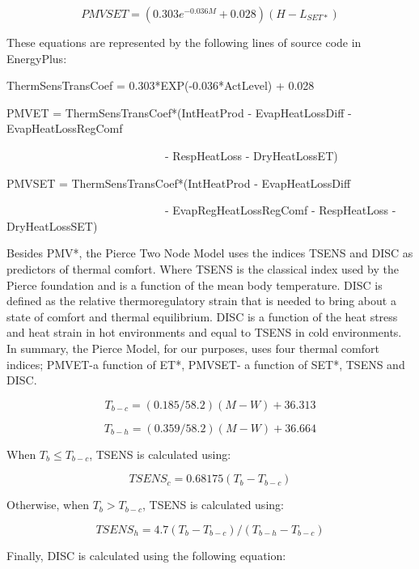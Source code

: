 \begin{equation}
PMVSET = (0.303{e^{ - 0.036M}} + 0.028)(H - {L_{SET*}})
\end{equation}

These equations are represented by the following lines of source code in EnergyPlus:

ThermSensTransCoef = 0.303*EXP(-0.036*ActLevel) + 0.028

PMVET = ThermSensTransCoef*(IntHeatProd - EvapHeatLossDiff - EvapHeatLossRegComf

~~~~~~~~~~~~~~~~~~~~~~~~~~~~- RespHeatLoss - DryHeatLossET)

PMVSET = ThermSensTransCoef*(IntHeatProd - EvapHeatLossDiff

~~~~~~~~~~~~~~~~~~~~~~~~~~~~- EvapRegHeatLossRegComf - RespHeatLoss - DryHeatLossSET)

Besides PMV*, the Pierce Two Node Model uses the indices TSENS and DISC as predictors of thermal comfort. Where TSENS is the classical index used by the Pierce foundation and is a function of the mean body temperature. DISC is defined as the relative thermoregulatory strain that is needed to bring about a state of comfort and thermal equilibrium. DISC is a function of the heat stress and heat strain in hot environments and equal to TSENS in cold environments. In summary, the Pierce Model, for our purposes, uses four thermal comfort indices; PMVET-a function of ET*, PMVSET- a function of SET*, TSENS and DISC.

\begin{equation}
{T_{b - c}} = (0.185/58.2)(M - W) + 36.313
\end{equation}

\begin{equation}
{T_{b - h}} = (0.359/58.2)(M - W) + 36.664
\end{equation}

When \({T_b} \le {T_{b - c}}\), TSENS is calculated using:

\begin{equation}
TSEN{S_c} = 0.68175({T_b} - {T_{b - c}}) 
\end{equation}

Otherwise, when \({T_b} > {T_{b - c}}\), TSENS is calculated using:

\begin{equation}
TSEN{S_h} = 4.7({T_b} - {T_{b - c}})/({T_{b - h}} - {T_{b - c}})
\end{equation}

Finally, DISC is calculated using the following equation:

